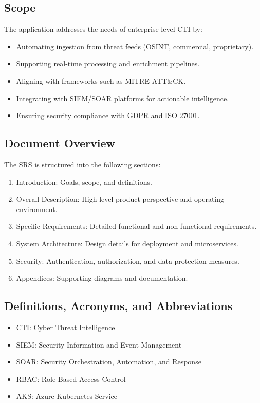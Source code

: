 \documentclass[12pt]{article}
\begin{document}
\subsection{Scope}
The application addresses the needs of enterprise-level CTI by:
\begin{itemize}
    \item Automating ingestion from threat feeds (OSINT, commercial, proprietary).
    \item Supporting real-time processing and enrichment pipelines.
    \item Aligning with frameworks such as MITRE ATT&CK.
    \item Integrating with SIEM/SOAR platforms for actionable intelligence.
    \item Ensuring security compliance with GDPR and ISO 27001.
\end{itemize}

\subsection{Document Overview}
The SRS is structured into the following sections:
\begin{enumerate}
    \item Introduction: Goals, scope, and definitions.
    \item Overall Description: High-level product perspective and operating environment.
    \item Specific Requirements: Detailed functional and non-functional requirements.
    \item System Architecture: Design details for deployment and microservices.
    \item Security: Authentication, authorization, and data protection measures.
    \item Appendices: Supporting diagrams and documentation.
\end{enumerate}

\subsection{Definitions, Acronyms, and Abbreviations}
\begin{itemize}
    \item CTI: Cyber Threat Intelligence
    \item SIEM: Security Information and Event Management
    \item SOAR: Security Orchestration, Automation, and Response
    \item RBAC: Role-Based Access Control
    \item AKS: Azure Kubernetes Service
\end{itemize}
\end{document}
